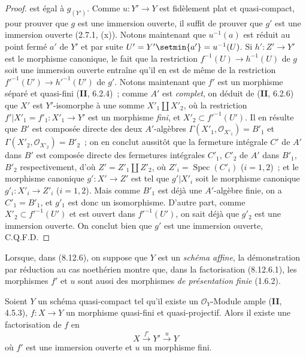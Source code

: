 \begin{proof}
est égal à $g_{(Y')}$. Comme $u:Y'\to Y$ est fidèlement plat et
quasi-compact, pour prouver que $g$ est une immersion ouverte, il suffit de
prouver que $g'$ est une immersion ouverte (2.7.1, (x)). Notons maintenant
que $u^{-1}(a)$ est réduit au point fermé $a'$ de $Y'$ et par suite
$U'=Y'\setmin\{a'\}=u^{-1}(U)$. Si $h':Z'\to Y'$ est le morphisme canonique, le
fait que la restriction $f^{-1}(U)\to h^{-1}(U)$ de $g$ soit une immersion
ouverte entraîne qu'il en est de même de la restriction
$f'^{-1}(U')\to h'^{-1}(U')$ de $g'$. Notons maintenant que $f'$ est un
morphisme séparé et quasi-fini (\textbf{II}, 6.2.4)~; comme $A'$ est \emph{complet},
on déduit de (\textbf{II}, 6.2.6) que $X'$ est $Y'$-isomorphe à une somme
$X'_1\amalg X'_2$, où la restriction
$f'|X'_1=f'_1:X'_1\to Y'$ est un morphisme \emph{fini}, et
$X'_2\subset f'^{-1}(U')$. Il en résulte que $B'$ est composée directe des
deux $A'$-algèbres
$\Gamma(X'_1,\mathcal O_{X'_1})=B'_1$ et
$\Gamma(X'_2,\mathcal O_{X'_2})=B'_2$~; on en conclut aussitôt que la
fermeture intégrale $C'$ de $A'$ dans $B'$ est composée directe des
fermetures intégrales $C'_1$, $C'_2$ de $A'$ dans $B'_1$, $B'_2$
respectivement, d'où $Z'=Z'_1\amalg Z'_2$, où
$Z'_i=\operatorname{Spec}(C'_i)$ ($i=1,2$)~; et le morphisme canonique
$g':X'\to Z'$ est tel que $g'|X'_i$ soit le morphisme canonique
$g'_i:X'_i\to Z'_i$ ($i=1,2$). Mais comme $B'_1$ est déjà une
$A'$-algèbre finie, on a $C'_1=B'_1$, et $g'_1$ est donc un isomorphisme.
D'autre part, comme $X'_2\subset f'^{-1}(U')$ et est ouvert dans
$f'^{-1}(U')$, on sait
déjà que $g'_2$ est une immersion ouverte. On conclut bien que $g'$ est une
immersion ouverte, C.Q.F.D.
\end{proof}

\begin{remark}[8.12.7]
\label{IV.8.12.7-fr}
Lorsque, dans (8.12.6), on suppose que $Y$ est un \emph{schéma affine}, la
démonstration par réduction au cas noethérien montre que, dans la
factorisation (8.12.6.1), les morphismes $f'$ et $u$ sont aussi des
morphismes \emph{de présentation finie} (1.6.2).
\end{remark}

\begin{corollary}[8.12.8]
\label{IV.8.12.8-fr}
Soient $Y$ un schéma quasi-compact tel qu'il existe un $\mathcal O_Y$-Module
ample \textup{(\textbf{II}, 4.5.3)}, $f:X\to Y$ un morphisme quasi-fini et quasi-projectif.
Alors il existe une factorisation de $f$ en
\[
X\xrightarrow{f'}Y'\xrightarrow{u}Y
\]
où $f'$ est une immersion ouverte et $u$ un morphisme fini.
\end{corollary}

